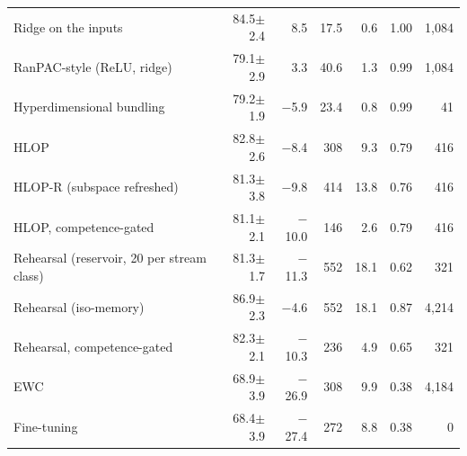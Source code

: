 \begin{tabular*}{\textwidth}{@{\extracolsep{\fill}}lrrrrrr@{}}
Ridge on the inputs & 84.5$\pm$2.4 & 8.5 & 17.5 & 0.6 & 1.00 & 1,084 \\
RanPAC-style (ReLU, ridge) & 79.1$\pm$2.9 & 3.3 & 40.6 & 1.3 & 0.99 & 1,084 \\
Hyperdimensional bundling & 79.2$\pm$1.9 & \ensuremath{-}5.9 & 23.4 & 0.8 & 0.99 & 41 \\
HLOP & 82.8$\pm$2.6 & \ensuremath{-}8.4 & 308 & 9.3 & 0.79 & 416 \\
HLOP-R (subspace refreshed) & 81.3$\pm$3.8 & \ensuremath{-}9.8 & 414 & 13.8 & 0.76 & 416 \\
HLOP, competence-gated & 81.1$\pm$2.1 & \ensuremath{-}10.0 & 146 & 2.6 & 0.79 & 416 \\
Rehearsal (reservoir, 20 per stream class) & 81.3$\pm$1.7 & \ensuremath{-}11.3 & 552 & 18.1 & 0.62 & 321 \\
Rehearsal (iso-memory) & 86.9$\pm$2.3 & \ensuremath{-}4.6 & 552 & 18.1 & 0.87 & 4,214 \\
Rehearsal, competence-gated & 82.3$\pm$2.1 & \ensuremath{-}10.3 & 236 & 4.9 & 0.65 & 321 \\
EWC & 68.9$\pm$3.9 & \ensuremath{-}26.9 & 308 & 9.9 & 0.38 & 4,184 \\
Fine-tuning & 68.4$\pm$3.9 & \ensuremath{-}27.4 & 272 & 8.8 & 0.38 & 0 \\
\bottomrule
\end{tabular*}
